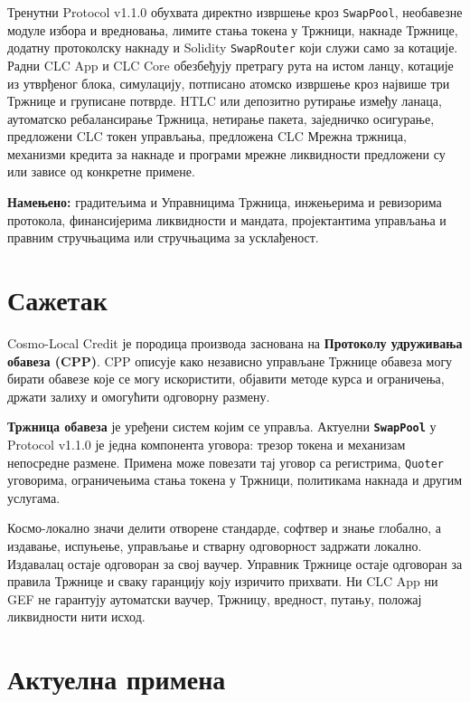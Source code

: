 \documentclass[11pt]{article}
\begin{document}
Тренутни Protocol v1.1.0 обухвата директно извршење кроз \texttt{SwapPool}, необавезне модуле избора и вредновања, лимите стања токена у Тржници, накнаде Тржнице, додатну протоколску накнаду и Solidity \texttt{SwapRouter} који служи само за котације. Радни CLC App и CLC Core обезбеђују претрагу рута на истом ланцу, котације из утврђеног блока, симулацију, потписано атомско извршење кроз највише три Тржнице и груписане потврде. HTLC или депозитно рутирање између ланаца, аутоматско ребалансирање Тржница, нетирање пакета, заједничко осигурање, предложени CLC токен управљања, предложена CLC Мрежна тржница, механизми кредита за накнаде и програми мрежне ликвидности предложени су или зависе од конкретне примене.

\textbf{Намењено:} градитељима и Управницима Тржница, инжењерима и ревизорима протокола, финансијерима ликвидности и мандата, пројектантима управљања и правним стручњацима или стручњацима за усклађеност.

\section*{Сажетак}

Cosmo-Local Credit је породица производа заснована на \textbf{Протоколу удруживања обавеза (CPP)}. CPP описује како независно управљане Тржнице обавеза могу бирати обавезе које се могу искористити, објавити методе курса и ограничења, држати залиху и омогућити одговорну размену.

\textbf{Тржница обавеза} је уређени систем којим се управља. Актуелни \textbf{\texttt{SwapPool}} у Protocol v1.1.0 је једна компонента уговора: трезор токена и механизам непосредне размене. Примена може повезати тај уговор са регистрима, \texttt{Quoter} уговорима, ограничењима стања токена у Тржници, политикама накнада и другим услугама.

Космо-локално значи делити отворене стандарде, софтвер и знање глобално, а издавање, испуњење, управљање и стварну одговорност задржати локално. Издавалац остаје одговоран за свој ваучер. Управник Тржнице остаје одговоран за правила Тржнице и сваку гаранцију коју изричито прихвати. Ни CLC App ни GEF не гарантују аутоматски ваучер, Тржницу, вредност, путању, положај ликвидности нити исход.

\section*{Актуелна примена}
\end{document}
